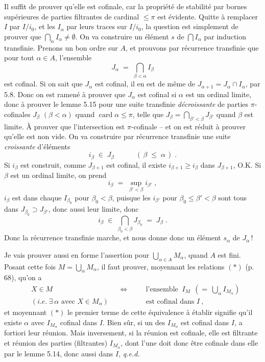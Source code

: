 \documentclass[11pt]{article}
\newcommand{\msp}[1]{\marginpar{\footnotesize [#1]}}
\newcommand{\card}{\operatorname{card}}
\begin{document}
Il suffit de prouver qu'elle est cofinale, car la propriété de stabilité par bornes supérieures de parties filtrantes de cardinal $\leq \pi$ est évidente. Quitte à remplacer $I$ par $I/i_{0}$, et les $I_{\alpha}$ par leurs traces sur $I/i_{0}$, la question est simplement de prouver que $\bigcap_{\alpha} I_{\alpha} \neq \emptyset$. On va construire un élément $s$ de $\bigcap I_{\alpha}$ par induction transfinie. Prenons un bon ordre sur $A$, et prouvons par récurrence transfinie
\msp{page 71}
que pour tout $\alpha \in A$, l'ensemble
\[
J_{\alpha} \;=\; \bigcap_{\beta<\alpha} I_{\beta}
\]
est cofinal. Si on sait que $J_{\alpha}$ est cofinal, il en est de même de $J_{\alpha+1} = J_{\alpha} \cap I_{\alpha}$, par 5.8. Donc on est ramené à prouver que $J_{\alpha}$ est cofinal si $\alpha$ est un ordinal limite, donc à prouver le lemme 5.15 pour une suite transfinie \textit{décroissante} de parties $\pi$-cofinales $J_{\beta}$ $(\beta < \alpha)$ quand $\card \alpha \leq \pi$, telle que $J_{\beta} = \bigcap_{\beta'<\beta} J_{\beta'}$ quand $\beta$ est limite. À prouver que l'intersection est $\pi$-cofinale -- et on est réduit à prouver qu'elle est non vide. On va construire par récurrence transfinie une suite \textit{croissante} d'éléments
\[
i_{\beta} \;\in\; J_{\beta} \qquad\quad (\, \beta \;\leq\; \alpha \,) \; .
\]
Si $i_{\beta}$ est construit, comme $J_{\beta+1}$ est cofinal, il existe $i_{\beta+1} \geq i_{\beta}$ dans $J_{\beta+1}$, O.K. Si $\beta$ est un ordinal limite, on prend
\[
i_{\beta} \;=\; \sup_{\beta'<\beta} i_{\beta'} \; ,
\]
$i_{\beta}$ est dans chaque $I_{\beta_{0}}$ pour $\beta_{0} < \beta$,
\msp{page 72}
puisque les $i_{\beta'}$ pour $\beta_{0} \leq \beta' < \beta$ sont tous dans $J_{\beta_{0}} \supset J_{\beta'}$, donc aussi leur limite, donc
\[
i_{\beta} \;\in\; \bigcap_{\beta_{0}<\beta} J_{\beta_{0}} \;=\; J_{\beta} \; .
\]
Donc la récurrence transfinie marche, et nous donne donc un élément $s_{\alpha}$ de $J_{\alpha}$\,!

Je vais prouver aussi en forme l'assertion pour $\bigcup_{\alpha\in A} M_{\alpha}$, quand $A$ est fini. Posant cette fois $M = \bigcup_{\alpha} M_{\alpha}$, il faut prouver, moyennant les relations $(*)$ (p. 68), qu'on a
\[
\begin{aligned}
&X \in M &&\Longleftrightarrow \quad &&\text{l'ensemble } \ I_{M} \ \ (= \ \textstyle\bigcup_{\alpha} I_{M_{\alpha}})\\
&(\textit{i.e.} \ \exists \ \alpha \text{ avec } X \in M_{\alpha}) && &&\text{est cofinal dans } I \ ,
\end{aligned}
\tag*{$(**)$}
\]
et moyennant $(*)$ le premier terme de cette équivalence à établir signifie qu'il existe $\alpha$ avec $I_{M_{\alpha}}$ cofinal dans $I$. Bien sûr, si un des $I_{M_{\alpha}}$ est cofinal dans $I$, a fortiori leur réunion. Mais inversement, si la réunion est cofinale, elle est filtrante et réunion des parties (filtrantes) $I_{M_{\alpha}}$, dont l'une doit donc être cofinale dans elle par le lemme 5.14, donc aussi dans $I$, \textit{q.e.d.}
\end{document}
